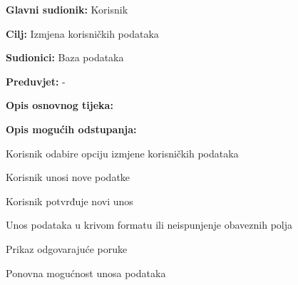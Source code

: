 					\noindent {}
					\begin{packed_item}
						
						\item \textbf{Glavni sudionik: }Korisnik
						\item  \textbf{Cilj:} Izmjena korisničkih podataka 
						\item  \textbf{Sudionici:} Baza podataka
						\item  \textbf{Preduvjet:} -
						\item  \textbf{Opis osnovnog tijeka:}
						
						\item  \textbf{Opis mogućih odstupanja:}
						\item[] \begin{packed_enum}
							
							\item Korisnik odabire opciju izmjene korisničkih podataka
							\item Korisnik unosi nove podatke
							\item Korisnik potvrđuje novi unos
							
						\end{packed_enum}
					
						\item[] \begin{packed_item}
							
							\item[2.a] Unos podataka u krivom formatu ili neispunjenje obaveznih polja
							\item[] \begin{packed_enum}
								
								\item Prikaz odgovarajuće poruke
								\item Ponovna mogućnost unosa podataka
								
							\end{packed_enum}
							
						\end{packed_item}
						
					\end{packed_item}
				

